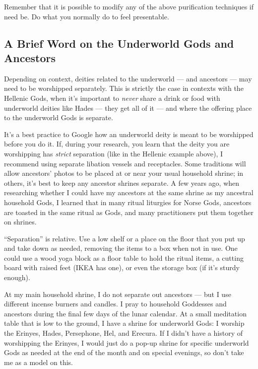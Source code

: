 \documentclass[
]{book}
\begin{document}
Remember that it is possible to modify any of the above purification techniques if need be. Do what you normally do to feel presentable.

\hypertarget{a-brief-word-on-the-underworld-gods-and-ancestors}{%
\subsection{A Brief Word on the Underworld Gods and Ancestors}\label{a-brief-word-on-the-underworld-gods-and-ancestors}}

Depending on context, deities related to the underworld --- and ancestors --- may need to be worshipped separately. This is strictly the case in contexts with the Hellenic Gods, when it's important to \emph{never} share a drink or food with underworld deities like Hades --- they get all of it --- and where the offering place to the underworld Gods is separate.

It's a best practice to Google how an underworld deity is meant to be worshipped before you do it. If, during your research, you learn that the deity you are worshipping has \emph{strict} separation (like in the Hellenic example above), I recommend using separate libation vessels and receptacles. Some traditions will allow ancestors' photos to be placed at or near your usual household shrine; in others, it's best to keep any ancestor shrines separate. A few years ago, when researching whether I could have my ancestors at the same shrine as my ancestral household Gods, I learned that in many ritual liturgies for Norse Gods, ancestors are toasted in the same ritual as Gods, and many practitioners put them together on shrines.

``Separation'' is relative. Use a low shelf or a place on the floor that you put up and take down as needed, removing the items to a box when not in use. One could use a wood yoga block as a floor table to hold the ritual items, a cutting board with raised feet (IKEA has one), or even the storage box (if it's sturdy enough).

At my main household shrine, I do not separate out ancestors --- but I use different incense burners and candles. I pray to household Goddesses and ancestors during the final few days of the lunar calendar. At a small meditation table that is low to the ground, I have a shrine for underworld Gods: I worship the Erinyes, Hades, Persephone, Hel, and Erecura. If I didn't have a history of worshipping the Erinyes, I would just do a pop-up shrine for specific underworld Gods as needed at the end of the month and on special evenings, so don't take me as a model on this.
\end{document}
